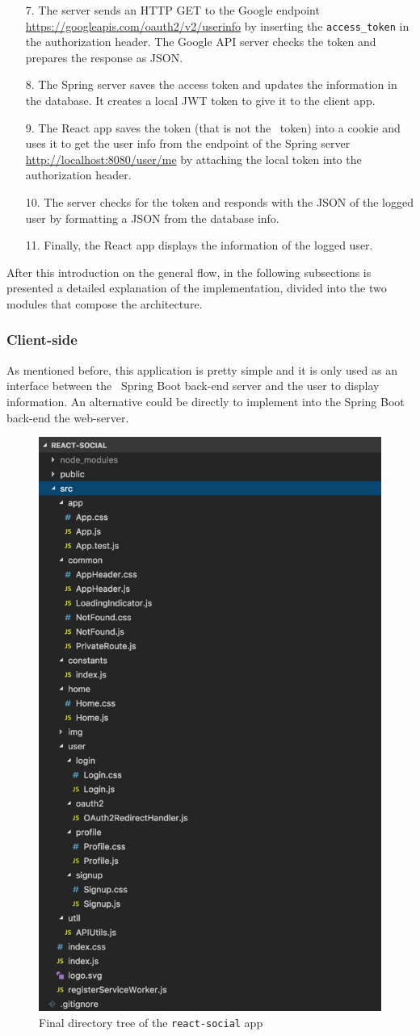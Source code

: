 \begin{enumerate}
    \item[7.] The server sends an HTTP GET to the Google endpoint \url{https://googleapis.com/oauth2/v2/userinfo} by inserting the \texttt{access\_token} in the authorization header. The Google API server checks the token and prepares the response as JSON.
    \item[8.] The Spring server saves the access token and updates the information in the database. It creates a local JWT token to give it to the client app.
    \item[9.] The React app saves the token  (that is not the \oauth\ token) into a cookie and uses it to get the user info from the endpoint of the Spring server \url{http://localhost:8080/user/me} by attaching the local token into the authorization header.
    \item[10.] The server checks for the token and responds with the JSON of the logged user by formatting a JSON from the database info.
    \item[11.] Finally, the React app displays the information of the logged user.
\end{enumerate}

After this introduction on the general flow, in the following subsections is presented a detailed explanation of the implementation, divided into the two modules that compose the architecture.

\subsubsection{Client-side}
As mentioned before, this application is pretty simple and it is only used as an interface between the \oauth\ Spring Boot back-end server and the user to display information. An alternative could be directly to implement into the Spring Boot back-end the web-server.

\begin{figure}
  \begin{center}
    \includegraphics[width=0.30 \textwidth]{chapters/images/chp6/dirreact.jpg}
  \end{center}
  \caption{Final directory tree of the \texttt{react-social} app}
  \label{fig:dirtree}
\end{figure}

